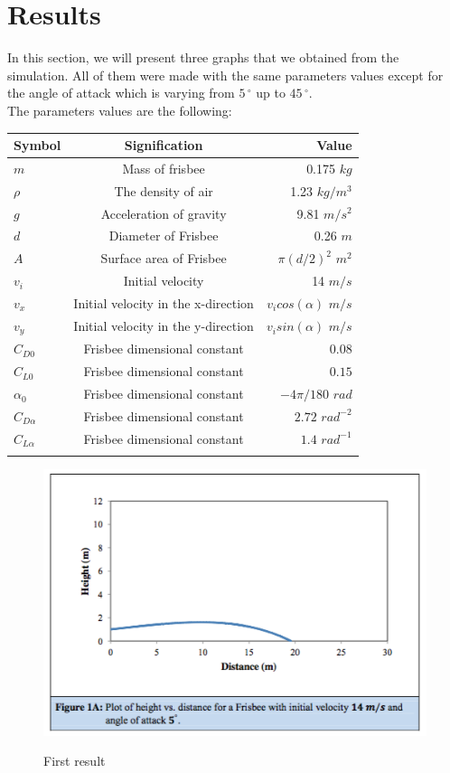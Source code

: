 \documentclass[10pt,a4paper]{report}
\begin{document}
\section{Results}
In this section, we will present three graphs that we obtained from the simulation\cite{art5}. All of them were made with the same parameters values except for the angle of attack which is varying from $5\,^{\circ}$ up to $45\,^{\circ} $. 
\\The parameters values are the following:
\\
\begin{center}
\begin{tabular}{|l|c|r|}
  \hline
  Symbol & Signification & Value \\
  \hline
  $m$ & Mass of frisbee & 0.175 $kg$\\
  $\rho$ & The density of air & 1.23 $kg/m^3$\\
  $g$ & Acceleration of gravity & 9.81 $m/s^2$ \\
  $d$ & Diameter of Frisbee & 0.26 $m$ \\
  $A$ & Surface area of Frisbee & $\pi (d/2)^2$ $m^2$ \\
  $v_i$ & Initial velocity & 14 $m/s$ \\
  $v_x$ & Initial velocity in the x-direction & $v_icos(\alpha)$ $m/s$ \\
  $v_y$ & Initial velocity in the y-direction & $v_isin(\alpha)$ $m/s$ \\
  $C_{D0}$ & Frisbee dimensional constant & $0.08$ \\
  $C_{L0}$ & Frisbee dimensional constant & $0.15$ \\
  $\alpha_0$ & Frisbee dimensional constant & $-4\pi / 180$ $rad$ \\
  $C_{D\alpha}$ & Frisbee dimensional constant & $2.72$ $rad^{-2}$\\
  $C_{L\alpha}$ & Frisbee dimensional constant & $1.4 $ $rad^{-1}$\\
  \\
  \hline
\end{tabular}
\end{center}
\begin{figure}[H]
 \centering
\includegraphics[scale=0.6]{graph1.jpg}
\caption{First result}\cite{art5}
\label{First result}
\end{figure}
\end{document}
